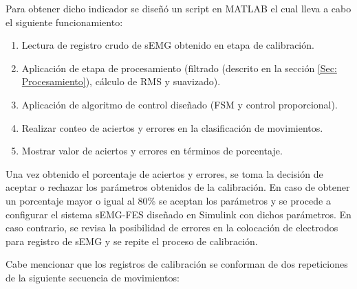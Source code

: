
Para obtener dicho indicador se diseñó un script en MATLAB \textregistered \; el cual lleva a cabo el siguiente funcionamiento:

\begin{enumerate}
	\item Lectura de registro crudo de sEMG obtenido en etapa de calibración.
	\item Aplicación de etapa de procesamiento (filtrado (descrito en la sección \ref{Sec: Procesamiento}), cálculo de RMS y suavizado).
	\item Aplicación de algoritmo de control diseñado (FSM y control proporcional).
	\item Realizar conteo de aciertos y errores en la clasificación de movimientos.
	\item Mostrar valor de aciertos y errores en términos de porcentaje.
\end{enumerate}

Una vez obtenido el porcentaje de aciertos y errores, se toma la decisión de aceptar o rechazar los parámetros obtenidos de la calibración. En caso de obtener un porcentaje mayor o igual al 80\% se aceptan los parámetros y se procede a configurar el sistema sEMG-FES diseñado en Simulink \textregistered \; con dichos parámetros. En caso contrario, se revisa la posibilidad de errores en la colocación de electrodos para registro de sEMG y se repite el proceso de calibración.

Cabe mencionar que los registros de calibración se conforman de dos repeticiones de la siguiente secuencia de movimientos:

